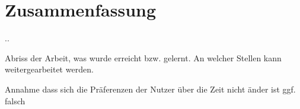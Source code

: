 
\section{Zusammenfassung}\newpage.\newpage\newpage.\newpage\newpage

	Abriss der Arbeit, was wurde erreicht bzw. gelernt. An welcher Stellen kann weitergearbeitet werden. 


Annahme dass sich die Präferenzen der Nutzer über die Zeit nicht änder ist ggf. falsch
